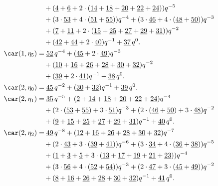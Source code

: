 \begin{align*}
	&\quad+(\underline{4}+\underline{6}+2\cdot(\underline{14}+\underline{18}+\underline{20}+\underline{22}+\underline{24}))q^{-5}\\
	&\quad+(3\cdot\underline{53}+4\cdot(\underline{51}+\underline{55}))q^{-4}+(3\cdot\underline{46}+4\cdot(\underline{48}+\underline{50}))q^{-3}\\
	&\quad+(\underline{7}+\underline{11}+2\cdot(\underline{15}+\underline{25}+\underline{27}+\underline{29}+\underline{31}))q^{-2}\\
	&\quad+(\underline{42}+\underline{44}+2\cdot\underline{40})q^{-1}+\underline{37}\,q^0.\\
	\car(1,\eta_{5})
	&=\underline{52}\,q^{-4}+(\underline{45}+2\cdot\underline{49})q^{-3}\\
	&\quad+(\underline{10}+\underline{16}+\underline{26}+\underline{28}+\underline{30}+\underline{32})q^{-2}\\
	&\quad+(\underline{39}+2\cdot\underline{41})q^{-1}+\underline{38}\,q^0.\\
	\car(2,\eta_{0})
	&=\underline{45}\,q^{-2}+(\underline{30}+\underline{32})q^{-1}+\underline{39}\,q^0.\\
	\car(2,\eta_{1})
	&=\underline{35}\,q^{-5}+(\underline{2}+\underline{14}+\underline{18}+\underline{20}+\underline{22}+\underline{24})q^{-4}\\
	&\quad+(2\cdot(\underline{53}+\underline{55})+3\cdot\underline{51})q^{-3}+(2\cdot(\underline{46}+\underline{50})+3\cdot\underline{48})q^{-2}\\
	&\quad+(\underline{9}+\underline{15}+\underline{25}+\underline{27}+\underline{29}+\underline{31})q^{-1}+\underline{40}\,q^0.\\
	\car(2,\eta_{2})
	&=\underline{49}\,q^{-8}+(\underline{12}+\underline{16}+\underline{26}+\underline{28}+\underline{30}+\underline{32})q^{-7}\\
	&\quad+(2\cdot\underline{43}+3\cdot(\underline{39}+\underline{41}))q^{-6}+(3\cdot\underline{34}+4\cdot(\underline{36}+\underline{38}))q^{-5}\\
	&\quad+(\underline{1}+\underline{3}+\underline{5}+3\cdot(\underline{13}+\underline{17}+\underline{19}+\underline{21}+\underline{23}))q^{-4}\\
	&\quad+(3\cdot\underline{56}+4\cdot(\underline{52}+\underline{54}))q^{-3}+(2\cdot\underline{47}+3\cdot(\underline{45}+\underline{49}))q^{-2}\\
	&\quad+(\underline{8}+\underline{16}+\underline{26}+\underline{28}+\underline{30}+\underline{32})q^{-1}+\underline{41}\,q^0.\\

\end{align*}
